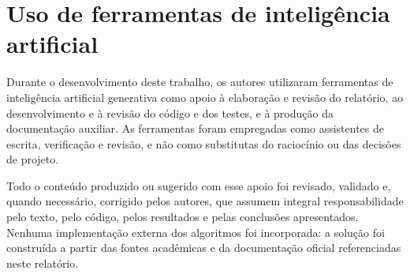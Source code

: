 \section{Uso de ferramentas de inteligência artificial}
\label{sec:uso-ia}

Durante o desenvolvimento deste trabalho, os autores utilizaram ferramentas de inteligência artificial generativa como apoio à elaboração e revisão do relatório, ao desenvolvimento e à revisão do código e dos testes, e à produção da documentação auxiliar. As ferramentas foram empregadas como assistentes de escrita, verificação e revisão, e não como substitutas do raciocínio ou das decisões de projeto.

Todo o conteúdo produzido ou sugerido com esse apoio foi revisado, validado e, quando necessário, corrigido pelos autores, que assumem integral responsabilidade pelo texto, pelo código, pelos resultados e pelas conclusões apresentados. Nenhuma implementação externa dos algoritmos foi incorporada: a solução foi construída a partir das fontes acadêmicas e da documentação oficial referenciadas neste relatório.
